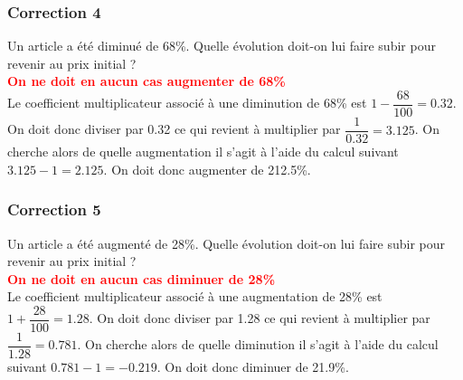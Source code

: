 \documentclass[15pt, mathserif]{beamer}
\begin{document}
\begin{frame}
\vspace{-10mm}
	\frametitle{Correction 4}
\vspace*{1cm} Un article a été diminué de 68\%. Quelle évolution doit-on lui faire subir pour revenir au prix initial ? \\ \bcattention \textcolor{red}{\textbf{On ne doit en aucun cas augmenter de 68\%}} \\ Le coefficient multiplicateur associé à une diminution de 68\% est $1-\dfrac{68}{100}=0.32$. On doit donc diviser par 0.32 ce qui revient à multiplier par $\dfrac{1}{0.32}=3.125$. On cherche alors de quelle augmentation il s'agit à l'aide du calcul suivant $3.125-1=2.125$. On doit donc augmenter de 212.5\%. \\ \begin{center}  
  \end{center}\end{frame}


\begin{frame}
\vspace{-10mm}
	\frametitle{Correction 5}
\vspace*{1cm} Un article a été augmenté de 28\%. Quelle évolution doit-on lui faire subir pour revenir au prix initial ? \\ \bcattention \textcolor{red}{\textbf{On ne doit en aucun cas diminuer de 28\% }} \\ Le coefficient multiplicateur associé à une augmentation de 28\% est $1+\dfrac{28}{100}=1.28$. On doit donc diviser par 1.28 ce qui revient à multiplier par $\dfrac{1}{1.28}=0.781$. On cherche alors de quelle diminution il s'agit à l'aide du calcul suivant $0.781-1=-0.219$. On doit donc diminuer de 21.9\%. \\ \begin{center}  
  \end{center}\end{frame}
\end{document}

